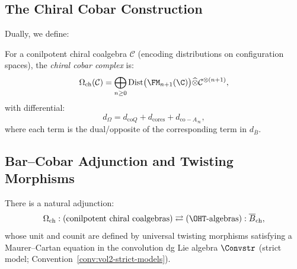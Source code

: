 \subsection{The Chiral Cobar Construction}
Dually, we define:

\begin{definition}
\label{def:chiral_cobar}
For a conilpotent chiral coalgebra $\mathcal{C}$ (encoding distributions on configuration spaces), the \emph{chiral cobar complex} is:
\begin{equation}
\Omega_{\text{ch}}(\mathcal{C}) = \bigoplus_{n \geq 0} \text{Dist}\big(\FM_{n+1}(\C)\big) \widehat{\otimes} \mathcal{C}^{\otimes (n+1)},
\end{equation}
with differential:
\begin{equation}
d_{\Omega} = d_{\text{co}Q} + d_{\text{cores}} + d_{\text{co}-A_\infty},
\end{equation}
where each term is the dual/opposite of the corresponding term in $d_{\overline{B}}$.
\end{definition}

\subsection{Bar--Cobar Adjunction and Twisting Morphisms}

\begin{theorem}
\label{thm:bar_cobar_adjunction}
There is a natural adjunction:
\begin{equation}
\Omega_{\text{ch}} : (\text{conilpotent chiral coalgebras}) \rightleftarrows (\OHT\text{-algebras}) : \overline{B}_{\text{ch}},
\end{equation}
whose unit and counit are defined by universal twisting morphisms satisfying a Maurer--Cartan equation in the convolution dg Lie algebra $\Convstr$ (strict model; Convention~\ref{conv:vol2-strict-models}).
\end{theorem}

